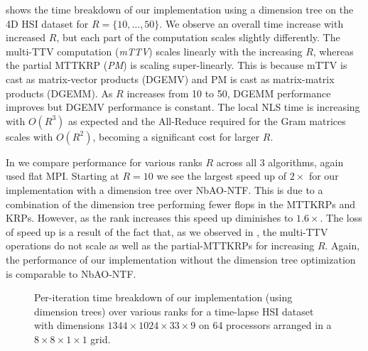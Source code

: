  shows the time breakdown of our implementation using a dimension tree on the 4D HSI dataset for $R=\{10,\dots,50\}$. 
We observe an overall time increase with increased $R$, but each part of the computation scales slightly differently.
The multi-TTV computation ({\em mTTV}) scales linearly with the increasing $R$,  whereas the partial MTTKRP ({\em PM}) is scaling super-linearly. 
This is because mTTV is cast as matrix-vector products (DGEMV) and PM is cast as matrix-matrix products (DGEMM).
As $R$ increases from 10 to 50, DGEMM performance improves but DGEMV performance is constant.  
The local NLS time is increasing with $O(R^3)$ as expected and the All-Reduce required for the Gram matrices scales with $O(R^2)$, becoming a significant cost for larger $R$. 

In  we compare performance for various ranks $R$ across all 3 algorithms, again used flat MPI. 
Starting at $R=10$ we see the largest speed up of $2\times$ for our implementation with a dimension tree over NbAO-NTF. 
This is due to a combination of the dimension tree performing fewer flops in the MTTKRPs and KRPs. 
However, as the rank increases this speed up diminishes to $1.6\times$. 
The loss of speed up is a result of the fact that, as we observed in , the multi-TTV operations do not scale as well as the partial-MTTKRPs for increasing $R$.
Again, the performance of our implementation without the dimension tree optimization is comparable to NbAO-NTF. 

\begin{figure}
\renewcommand{\datafile}{data/ksw_4D_HSI.dat}
\renewcommand{\numiterations}{10}
\caption{Per-iteration time breakdown of our implementation (using dimension trees) over various ranks for a time-lapse HSI dataset with dimensions $1344\times 1024\times 33 \times 9$ on 64 processors arranged in a $8\times8\times1\times1$ grid.}
\label{fig:ksweep4DHSI}
\end{figure}

